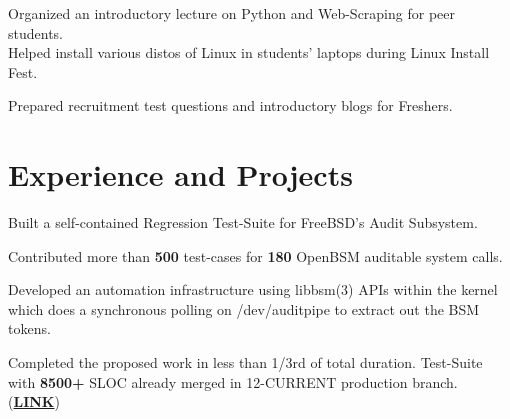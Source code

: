 \documentclass[]{deedy-resume-openfont}
\begin{document}
\begin{minipage}[t]{0.30\textwidth}
Organized an introductory lecture on Python and Web-Scraping for peer students. \\
\vspace{0.1cm}
Helped install various distos of Linux in students' laptops during Linux Install Fest.
\vspace{0.1cm}

Prepared recruitment test questions and introductory blogs for Freshers. \\

%
%

\end{minipage} 
\hfill
\begin{minipage}[t]{0.70\textwidth} 

\vspace{-0.7cm}
\section{Experience and Projects}
\vspace{\topsep} %
\begin{tightemize}
  \item Built a self-contained Regression Test-Suite for FreeBSD's Audit Subsystem. 
  \item Contributed more than \textbf{500} test-cases for \textbf{180} OpenBSM auditable system calls.
  \item Developed an automation infrastructure using libbsm(3) APIs within the kernel which does a synchronous polling on /dev/auditpipe to extract out the BSM tokens.
  \item	Completed the proposed work in less than 1/3rd of total duration. Test-Suite with \textbf{8500+} SLOC already merged in 12-CURRENT production branch. (\href{https://github.com/freebsd/freebsd/tree/master/tests/sys/audit}{\textbf{LINK}})
\end{tightemize}


\end{minipage}
\end{document}

